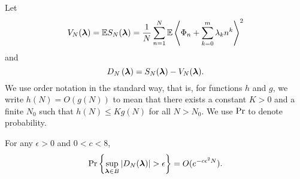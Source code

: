 \documentclass[journal]{IEEEtran}
\begin{document}
Let
\[
V_N(\boldsymbol{\lambda}) =  {\mathbb E} S_N(\boldsymbol{\lambda}) = \frac{1}{N}\sum_{n=1}^{N} {\mathbb E} \left\langle   \Phi_{n}+\sum_{k = 0}^{m}{\lambda_k n^k} \right\rangle  ^{2}
\]
and
 \[
 D_{N}\left( \boldsymbol{\lambda} \right)  =  S_N(\boldsymbol{\lambda}) - V_N(\boldsymbol{\lambda}).
 \]
We use order notation in the standard way, that is, for functions $h$ and $g$, we write $h(N) = O(g(N))$ to mean that there exists a constant $K > 0$ and a finite $N_0$ such that $h(N) \leq K g(N)$ for all $N > N_0$.  We use $\operatorname{Pr}$ to denote probability.

\begin{lemma} \label{lem:vn} 
For any $\epsilon > 0$ and $0 < c < 8$,
\[
\operatorname{Pr} \left\{ \sup_{\boldsymbol{\lambda} \in B}\left\vert  D_N(\boldsymbol{\lambda})  \right\vert > \epsilon \right\} = O(e^{-c \epsilon^2 N}).
\]
 \end{lemma}
\end{document}
